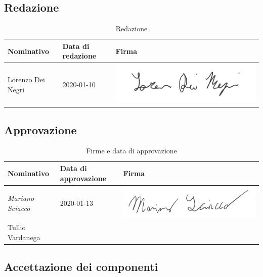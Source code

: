 		\subsection{Redazione}
			
			\begin{table}[!h]
				\centering
					\begin{tabular}{|l|l|l|}
						\hline
						\textbf{Nominativo} & \textbf{Data di redazione} & \textbf{Firma} \\ \hline
						Lorenzo Dei Negri & 2020-01-10 &  \includegraphics[scale=0.6]{images/firme/lorenzo} \\ \hline
					\end{tabular}
				\caption{Redazione}
			\end{table}
		
		\subsection{Approvazione}
			
			\begin{table}[!h]
				\centering
				\begin{tabular}{|l|l|l|}
					\hline
					\textbf{Nominativo} & \textbf{Data di approvazione} & \textbf{Firma} \\ \hline
					\textit{Mariano Sciacco} & 2020-01-13 &  \includegraphics[scale=0.6]{images/firme/mariano}  \\ \hline
					Tullio Vardanega &  & \\ \hline
				\end{tabular}
				\caption{Firme e data di approvazione}
			\end{table}
			
		\subsection{Accettazione dei componenti}
			
